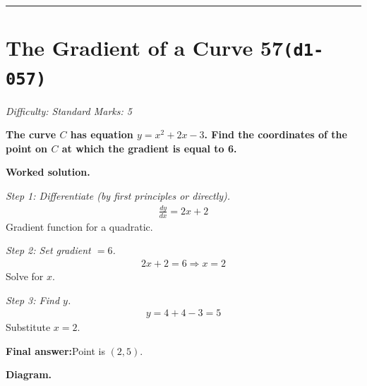 \documentclass[11pt]{article}
\newcommand{\question}[1]{\par\medskip\noindent\textbf{#1}\par}
\begin{document}
\medskip\hrule

\section*{The Gradient of a Curve 57\quad\small\texttt{(d1-057)}}
\textit{Difficulty: Standard \quad\textbar\quad Marks: 5}

\question{The curve \( C \) has equation \( y = x^2 + 2x - 3 \). Find the coordinates of the point on \( C \) at which the gradient is equal to 6.}

\textbf{Worked solution.}

\textit{Step 1: Differentiate (by first principles or directly).}
\[\begin{gathered}
\frac{dy}{dx} = 2x + 2
\end{gathered}\]
Gradient function for a quadratic.

\textit{Step 2: Set gradient \( = 6 \).}
\[\begin{gathered}
2x + 2 = 6 \Rightarrow x = 2
\end{gathered}\]
Solve for \( x \).

\textit{Step 3: Find \( y \).}
\[\begin{gathered}
y = 4 + 4 - 3 = 5
\end{gathered}\]
Substitute \( x = 2 \).

\begin{answerbox}
\textbf{Final answer:}\quad Point is \(\displaystyle  (2, 5) \).
\end{answerbox}
\textbf{Diagram.}
\end{document}
